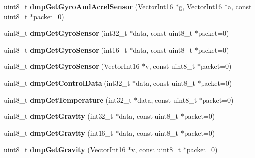 \begin{DoxyCompactItemize}
\mbox{\label{classMPU6050_a13b5eff727ce232fef884ee67df4487f}} 
uint8\+\_\+t {\bfseries dmp\+Get\+Gyro\+And\+Accel\+Sensor} (Vector\+Int16 $\ast$g, Vector\+Int16 $\ast$a, const uint8\+\_\+t $\ast$packet=0)
\item 
\mbox{\label{classMPU6050_adfe0bc92f57cf489583d5c3b07d7aefb}} 
uint8\+\_\+t {\bfseries dmp\+Get\+Gyro\+Sensor} (int32\+\_\+t $\ast$data, const uint8\+\_\+t $\ast$packet=0)
\item 
\mbox{\label{classMPU6050_a1c79849a8c39eb918945e98aea1dd878}} 
uint8\+\_\+t {\bfseries dmp\+Get\+Gyro\+Sensor} (int16\+\_\+t $\ast$data, const uint8\+\_\+t $\ast$packet=0)
\item 
\mbox{\label{classMPU6050_ad77de2fac9ea2b9c5e94aa245670fe48}} 
uint8\+\_\+t {\bfseries dmp\+Get\+Gyro\+Sensor} (Vector\+Int16 $\ast$v, const uint8\+\_\+t $\ast$packet=0)
\item 
\mbox{\label{classMPU6050_a7c11e874e2f0009503e0014dd2b1bf85}} 
uint8\+\_\+t {\bfseries dmp\+Get\+Control\+Data} (int32\+\_\+t $\ast$data, const uint8\+\_\+t $\ast$packet=0)
\item 
\mbox{\label{classMPU6050_a799f73f0eb419057b5fe2a02d7f1905d}} 
uint8\+\_\+t {\bfseries dmp\+Get\+Temperature} (int32\+\_\+t $\ast$data, const uint8\+\_\+t $\ast$packet=0)
\item 
\mbox{\label{classMPU6050_a4411714ec5a1bb90e4c224d5e9d98b56}} 
uint8\+\_\+t {\bfseries dmp\+Get\+Gravity} (int32\+\_\+t $\ast$data, const uint8\+\_\+t $\ast$packet=0)
\item 
\mbox{\label{classMPU6050_a557400f9ca5f07ff7d0d71f27f7a5169}} 
uint8\+\_\+t {\bfseries dmp\+Get\+Gravity} (int16\+\_\+t $\ast$data, const uint8\+\_\+t $\ast$packet=0)
\item 
\mbox{\label{classMPU6050_adbeb3de073f6759bf8036a6f29697ea1}} 
uint8\+\_\+t {\bfseries dmp\+Get\+Gravity} (Vector\+Int16 $\ast$v, const uint8\+\_\+t $\ast$packet=0)
\item 
\mbox{\label{classMPU6050_aa061914109ac5a74ad93c26c903abdd4}} 

\end{DoxyCompactItemize}
